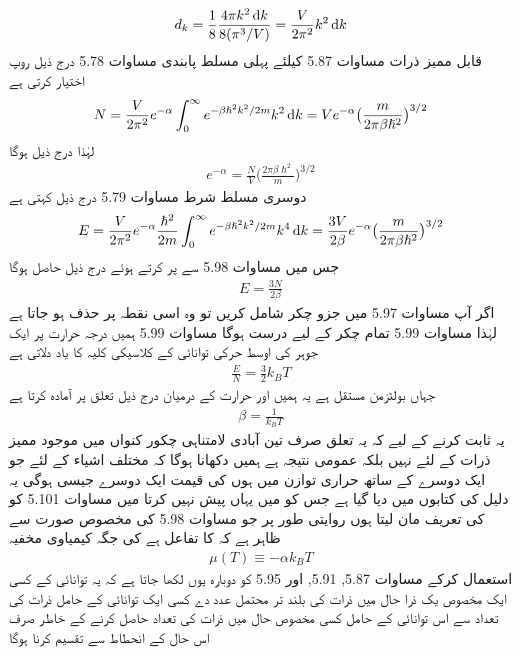 \begin{align}
d_k = \frac{1}{8} \frac{4 \pi k^2 \dif  k}{8 (\pi^3 /V)} = \frac{V}{2 \pi^2} k^2 \dif k
\end{align}
قابل ممیز ذرات مساوات 5.87 کیلئے پہلی مسلط پابندی مساوات 5.78 درج ذیل روپ اختیار کرتی ہے 
\begin{align*}
N = \frac{V}{2 \pi^2} e^{- \alpha} \int_0^{\infty} e^{- \beta \hslash^2 k^2 / 2m} k^2 \dif  k = V e^{- \alpha} \big ( \frac{m}{2 \pi \beta \hslash^2} \big )^{3/2}
\end{align*}
لہٰذا درج ذیل ہوگا 
\begin{align}
e^{- \alpha} = \frac{N}{V} \big ( \frac{2 \pi \beta \hslash^2}{m} \big )^{3/2}
\end{align}
دوسری مسلط شرط مساوات 5.79 درج ذیل کہتی ہے 
\begin{align*}
E = \frac{V}{2 \pi^2} e^{- \alpha} \frac{\hslash^2}{2 m} \int_0^\infty e^{- \beta \hslash^2 k^2 /2m} k^4 \dif k = \frac{3 V}{2 \beta} e^{- \alpha} \big ( \frac{m}{2 \pi \beta \hslash^2} \big )^{3/2}
\end{align*}
جس میں مساوات 5.98 سے  پر کرتے ہوئے درج ذیل حاصل ہوگا 
\begin{align}
E = \frac{3 N}{2 \beta}
\end{align}
اگر آپ مساوات 5.97 میں جزو چکر  شامل کریں تو وہ اسی نقطہ پر حذف ہو جاتا ہے لہٰذا مساوات 5.99 تمام چکر کے لیے درست ہوگا مساوات 5.99 ہمیں درجہ حرارت  پر ایک جوہر کی اوسط حرکی توانائی کے کلاسیکی کلیہ کا یاد دلاتی ہے 
\begin{align}
\frac{E}{N} = \frac{3}{2} k_B T
\end{align}
جہاں  بولٹزمن مستقل ہے یہ ہمیں  اور حرارت کے درمیان درج ذیل تعلق پر آمادہ کرتا ہے 
\begin{align}
\beta = \frac{1}{k_B T}
\end{align}
یہ ثابت کرنے کے لیے کہ یہ تعلق صرف تین آبادی لامتناہی چکور کنواں میں موجود ممیز ذرات کے لئے نہیں بلکہ عمومی نتیجہ ہے ہمیں دکھانا ہوگا کہ مختلف اشیاء کے لئے جو ایک دوسرے کے ساتھ حراری توازن میں ہوں  کی قیمت ایک دوسرے جیسی ہوگی یہ دلیل کی  کتابوں میں دیا گیا ہے جس کو میں یہاں پیش نہیں کرتا میں مساوات 5.101 کو  کی تعریف مان لیتا ہوں روایتی طور پر  جو مساوات 5.98 کی مخصوص صورت سے ظاہر ہے کہ  کا تفاعل ہے کی جگہ کیمیاوی مخفیہ 
\begin{align}
\mu (T) \equiv - \alpha k_B T
\end{align}
استعمال کرکے مساوات 5.87, 5.91, اور 5.95 کو دوبارہ یوں لکھا جاتا ہے کہ یہ توانائی  کے کسی ایک مخصوص يک ذرا حال میں ذرات کی بلند تر محتمل عدد دے کسی ایک توانائی کے حامل ذرات کی تعداد سے اس توانائی کے حامل کسی مخصوص حال میں ذرات کی تعداد حاصل کرنے کے خاطر صرف اس حال کے انحطاط سے تقسیم کرنا ہوگا 
